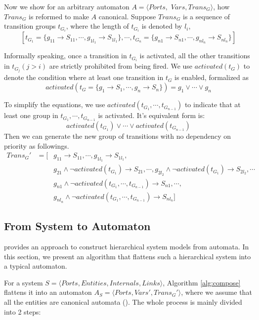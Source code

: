 Now we show for an arbitrary automaton $A=\langle Ports,$ $Vars,Trans_G\rangle$, how $Trans_G$ is reformed to make $A$ canonical.
Suppose $Trans_G$ is a sequence of transition groups $t_{G_i}$, where the length of $t_{G_i}$ is denoted by $l_i$,
\[
    [t_{G_1}=\{g_{11}\rightarrow S_{11},\cdots, g_{1l_1}\rightarrow S_{1l_1}\},\cdots,t_{G_n}=\{g_{n1}\rightarrow S_{n1},\cdots,g_{nl_n}\rightarrow S_{nl_n}\}]
\]

Informally speaking, once a transition in $t_{G_i}$ is activated, all the other transitions in $t_{G_j}(j>i)$ are strictly prohibited from being fired. We use $activated(t_G)$ to denote the condition where at least one transition in $t_G$ is enabled, formalized as
\[
    activated(t_G=\{g_1\rightarrow S_1,\cdots, g_n\rightarrow S_n\}) = g_1\lor\cdots\lor g_n
\]

To simplify the equations, we use $activated(t_{G_1},\cdots,t_{G_{n-1}})$ to indicate that at least one group in $t_{G_1},\cdots,t_{G_{n-1}}$ is activated. It's equivalent form is:
\[
    activated(t_{G_1})\lor\cdots\lor activated(t_{G_{n-1}})
\]
Then we can generate the new group of transitions with no dependency on priority as followings.
\begin{eqnarray*}
    Trans_G' & = [ & g_{11}\rightarrow S_{11}, \cdots ,g_{1l_1}\rightarrow S_{1l_1}, \\
    & & g_{21}\land \lnot activated(t_{G_1})\rightarrow S_{21}, \cdots, g_{2l_2} \land \lnot activated(t_{G_1})\rightarrow S_{2l_2}, \cdots \\
    & & g_{n1}\land \lnot activated(t_{G_1},\cdots,t_{G_{n-1}})\rightarrow S_{n1}, \cdots, \\
    & & g_{nl_n} \land \lnot activated(t_{G_1},\cdots, t_{G_{n-1}})\rightarrow S_{nl_n}]
\end{eqnarray*}


\subsection{From System to Automaton}
\label{subsec:composition}

\lang{} provides an approach to construct hierarchical system models from automata. In this section, we present an algorithm that flattens such a hierarchical system into a typical automaton.

For a system $S=\langle Ports, Entities, Internals, Links\rangle$, Algorithm \ref{alg:compose} flattens it into an automaton $A_S=\langle Ports,Vars',Trans_G'\rangle$, where we assume that all the entities are canonical automata (). The whole process is mainly divided into 2 steps:

